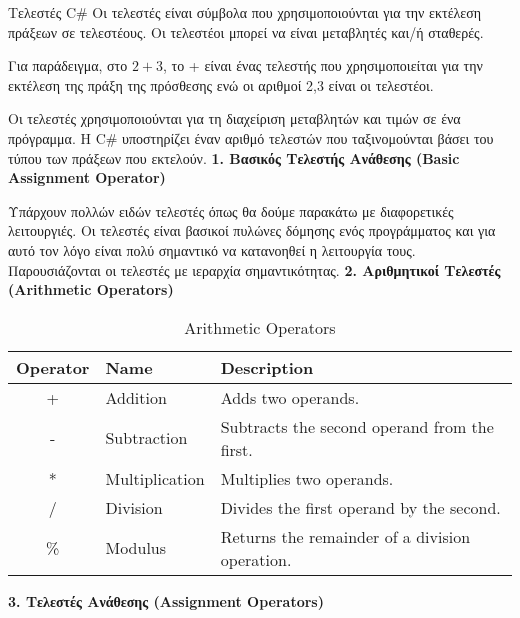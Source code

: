 Τελεστές C\#
Οι τελεστές είναι σύμβολα που χρησιμοποιούνται για την εκτέλεση πράξεων σε τελεστέους. Οι τελεστέοι μπορεί να είναι μεταβλητές και/ή σταθερές.

Για παράδειγμα, στο $2+3$, το + είναι ένας τελεστής που χρησιμοποιείται για την εκτέλεση της πράξη της πρόσθεσης ενώ οι αριθμοί 2,3 είναι οι τελεστέοι.

Οι τελεστές χρησιμοποιούνται για τη διαχείριση μεταβλητών και τιμών σε ένα πρόγραμμα. Η C\# υποστηρίζει έναν αριθμό τελεστών που ταξινομούνται βάσει του τύπου των πράξεων που εκτελούν.
\newpage 
\textbf{1. Βασικός Τελεστής Ανάθεσης (Basic Assignment Operator)}


 Υπάρχουν πολλών ειδών τελεστές όπως θα δούμε παρακάτω με διαφορετικές λειτουργιές. Οι τελεστές είναι βασικοί πυλώνες δόμησης ενός προγράμματος και για αυτό τον λόγο είναι πολύ σημαντικό
 να κατανοηθεί η λειτουργία τους. Παρουσιάζονται οι τελεστές με ιεραρχία σημαντικότητας.
\newpage
\textbf{2. Αριθμητικοί Τελεστές (Arithmetic Operators)}

\begin{table}[h!]
    \begin{tabular}{|c|l|p{8cm}|}
    \hline
    \textbf{Operator} & \textbf{Name} & \textbf{Description} \\ \hline
    + & Addition & Adds two operands. \\ \hline
    - & Subtraction & Subtracts the second operand from the first. \\ \hline
    * & Multiplication & Multiplies two operands. \\ \hline
    / & Division & Divides the first operand by the second. \\ \hline
    \% & Modulus & Returns the remainder of a division operation. \\ \hline
    \end{tabular}
    \caption{Arithmetic Operators}
    \label{table:operators}
\end{table}


\textbf{3. Τελεστές Ανάθεσης (Assignment Operators)}

